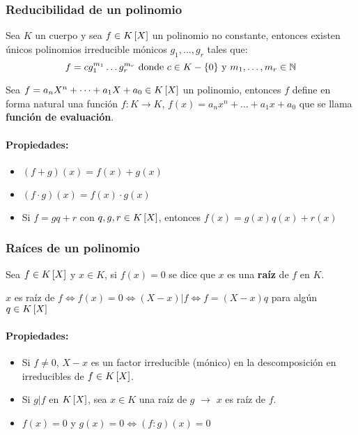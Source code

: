 \subsubsection{Reducibilidad de un polinomio}
Sea $K$ un cuerpo y sea $f\in K\left[X\right]$ un polinomio no constante, entonces existen únicos polinomios irreducible mónicos $g_1,\dots,g_r$ tales que: 
\begin{equation*}
    f = cg_1^{m_1}\dots g_r^{m_r} \text{ donde } c\in K-\{0\} \text{ y }  m_1,\dots,m_r\in\mathbb{N}
\end{equation*}

Sea $f = a_nX^n + \dots + a_1X + a_0 \in K\left[X\right]$ un polinomio, entonces $f$ define en forma natural una función $f:K\rightarrow K$, $f(x) = a_nx^n + \dots + a_1x + a_0$ que se llama \textbf{función de evaluación}.

\paragraph{Propiedades:}
\begin{itemize}
\item $(f+g)(x) = f(x) + g(x)$
\item $(f\cdot g)(x) = f(x)\cdot g(x)$
\item Si $f = gq + r$ con $q,g,r\in K\left[X\right]$, entonces $f(x) = g(x)q(x) + r(x)$
\end{itemize}

\subsubsection{Raíces de un polinomio}
Sea $f\in K\left[X\right]$ y $x\in K$, si $f(x)=0$ se dice que $x$ es una \textbf{raíz} de  $f$ en $K$.
\begin{center}
\begin{minipage}{0.8\textwidth}
$x$ es raíz de $f \iff f(x) = 0 \iff (X-x)|f \iff f = (X-x)q$ para algún $q\in K\left[X\right]$
\end{minipage}
\end{center}

\paragraph{Propiedades:}
\begin{itemize}
\item Si $f\neq 0$, $X-x$ es un factor irreducible (mónico) en la descomposición en irreducibles de $f\in K\left[X\right]$.
\item Si $g|f$ en $K\left[X\right]$, sea $x\in K$ una raíz de $g$ $\to$ $x$ es raíz de $f$.
\item $f(x)=0$ y $g(x) = 0 \iff (f:g)(x) = 0$
\end{itemize}


